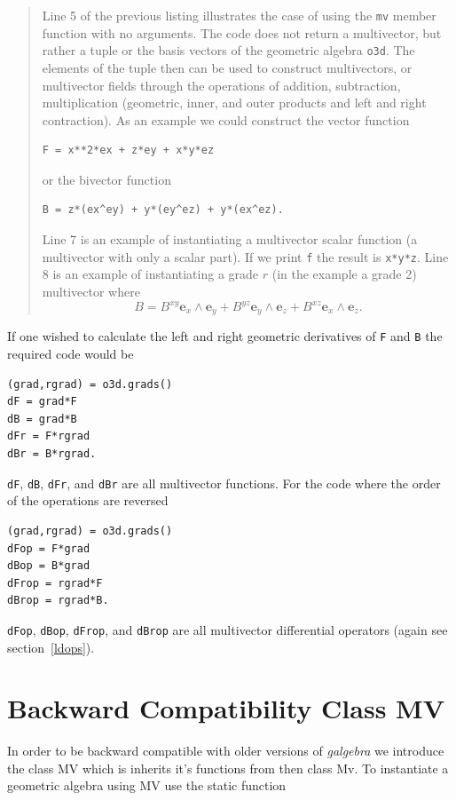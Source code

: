 \documentclass[12pt]{report}
\newcommand{\bm}[1]{\boldsymbol{#1}}
\newcommand{\W}{\wedge}
\newcommand{\T}[1]{\texttt{#1}}
\begin{document}
\begin{quote}
Line 5 of the previous listing illustrates the case of using the \T{mv} member function with
no arguments. The code does not return a multivector, but rather a tuple or the basis vectors of the geometric algebra \T{o3d}.
The elements of the tuple then can
be used to construct multivectors, or multivector fields through the operations
of addition, subtraction, multiplication (geometric, inner, and outer products and left and right contraction).
As an example we could construct the vector function
\begin{lstlisting}[numbers=none]
F = x**2*ex + z*ey + x*y*ez
\end{lstlisting}
\vspace{-12pt}or the bivector function
\begin{lstlisting}[numbers=none]
B = z*(ex^ey) + y*(ey^ez) + y*(ex^ez).
\end{lstlisting}
\vspace{-7pt}Line 7 is an example of instantiating a multivector scalar function (a multivector with only a scalar part). If
we print \T{f} the result is \T{x*y*z}.  Line 8 is an example of instantiating a grade $r$ (in the example a grade 2) multivector
where
\begin{equation}
    B = B^{xy}\bm{e}_{x}\W\bm{e}_{y}+B^{yz}\bm{e}_{y}\W\bm{e}_{z}+B^{xz}\bm{e}_{x}\W\bm{e}_{z}.
\end{equation}
\end{quote}
If one wished to calculate the left and right geometric derivatives of \T{F} and \T{B} the required code would be
\begin{lstlisting}
(grad,rgrad) = o3d.grads()
dF = grad*F
dB = grad*B
dFr = F*rgrad
dBr = B*rgrad.
\end{lstlisting}
\T{dF}, \T{dB}, \T{dFr}, and \T{dBr} are all multivector functions. For the code where the order of the operations are
reversed
\begin{lstlisting}
(grad,rgrad) = o3d.grads()
dFop = F*grad
dBop = B*grad
dFrop = rgrad*F
dBrop = rgrad*B.
\end{lstlisting}
\T{dFop}, \T{dBop}, \T{dFrop}, and \T{dBrop} are all multivector differential operators (again see section~\ref{ldops}).

\section{Backward Compatibility Class MV}

In order to be backward compatible with older versions of \emph{galgebra} we introduce the class MV which is inherits it's functions from
then class Mv. To instantiate a geometric algebra using MV use the static function
\end{document}
